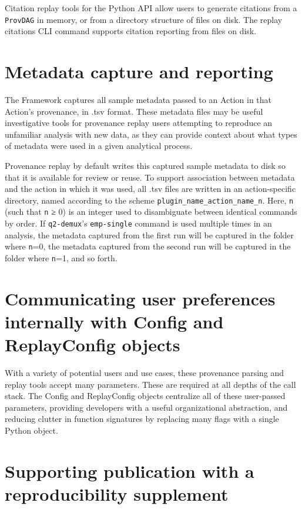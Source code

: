 Citation replay tools for the Python API allow users to generate citations from
a \texttt{ProvDAG} in memory, or from a directory structure of files on disk. The replay
citations CLI command supports citation reporting from files on disk.


\section{Metadata capture and reporting}

The Framework captures all sample metadata passed to an Action in that Action’s
provenance, in .tsv format. These metadata files may be useful investigative
tools for provenance replay users attempting to reproduce an unfamiliar analysis
with new data, as they can provide context about what types of metadata were
used in a given analytical process.

Provenance replay by default writes this captured sample metadata to disk so
that it is available for review or reuse. To support association between
metadata and the action in which it was used, all .tsv files are written in an
action-specific directory, named according to the scheme
\texttt{plugin\_name\_action\_name\_n}. Here, \texttt{n} (such that \texttt{n} ≥ 0) is an integer used to
disambiguate between identical commands by order. If \texttt{q2-demux}’s \texttt{emp-single}
command is used multiple times in an analysis, the metadata captured from the first
run will be captured in the folder where \texttt{n}=0, the metadata captured from the second
run will be captured in the folder where \texttt{n}=1, and so forth.


\section{Communicating user preferences internally with Config and ReplayConfig objects}

With a variety of potential users and use cases, these provenance parsing and
replay tools accept many parameters. These are required at all depths of the
call stack. The Config and ReplayConfig objects centralize all of these
user-passed parameters, providing developers with a useful organizational
abstraction, and reducing clutter in function signatures by replacing many flags
with a single Python object. 


\section{Supporting publication with a reproducibility supplement}


